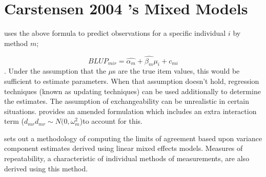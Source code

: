 \documentclass[12pt, a4paper]{report}
\theoremstyle{plain}
\theoremstyle{definition}
\theoremstyle{remark}
\begin{document}
	
	\section{Carstensen 2004 's Mixed Models}
	
	
	
	\citet{BXC2004} uses the above formula to predict observations for
	a specific individual $i$ by method $m$;
	
	\begin{equation}BLUP_{mir} = \hat{\alpha_{m}} + \hat{\beta_{m}}\mu_{i} +
	c_{mi} \end{equation}. Under the assumption that the $\mu$s are
	the true item values, this would be sufficient to estimate
	parameters. When that assumption doesn't hold, regression techniques (known as updating techniques)
	can be used additionally to determine the estimates.
	The assumption of exchangeability can be unrealistic in certain situations.
	\citet{BXC2004} provides an amended formulation which includes an extra interaction
	term ($d_{mr} d_{mr} \sim N(0,\omega^{2}_{m}$)to account for this.
	
	\citet{BXC2008} sets out a methodology of computing the limits of
	agreement based upon variance component estimates derived using
	linear mixed effects models. Measures of repeatability, a
	characteristic of individual methods of measurements, are also
	derived using this method.
	
\end{document}
